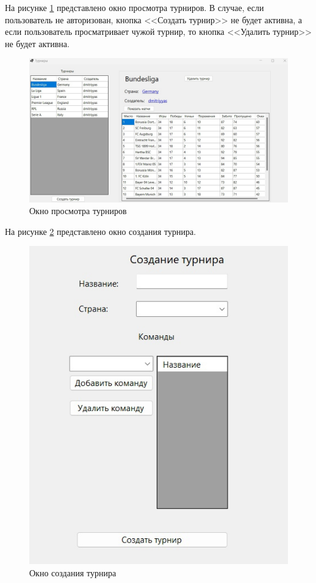 На рисунке \ref{img:tou} представлено окно просмотра турниров. В случае, если пользователь не авторизован, кнопка <<Создать турнир>> не будет активна, а если пользователь просматривает чужой турнир, то кнопка <<Удалить турнир>> не будет активна.
\begin{figure}
  \centering
  \includegraphics[scale=0.38]{inc/tours.jpg}
  \caption{Окно просмотра турниров}
  \label{img:tou}
\end{figure}
На рисунке \ref{img:touc} представлено окно создания турнира.
\begin{figure}
  \centering
  \includegraphics[scale=0.45]{inc/tourscr.jpg}
  \caption{Окно создания турнира}
  \label{img:touc}
\end{figure}

